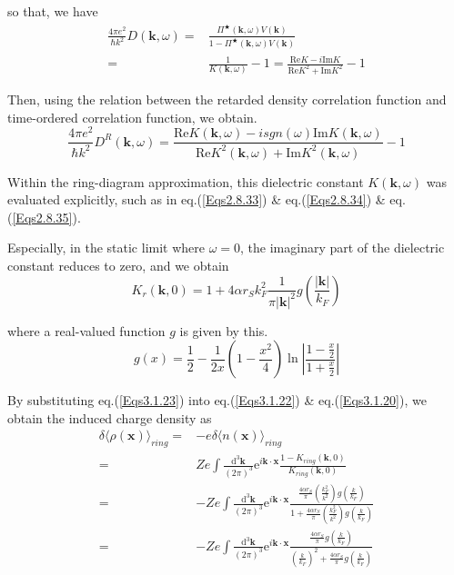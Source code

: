 so that, we have
\begin{equation} \label{Eqs3.1.21} \begin{split}
\frac{4\pi e^2}{\hbar k^2} D(\mathbf{k},\omega) =& \frac{\Pi^\bigstar(\mathbf{k},\omega)V(\mathbf{k})}{1-\Pi^\bigstar(\mathbf{k},\omega)V(\mathbf{k})}\\
=& \frac{1}{K(\mathbf{k},\omega)}-1 = \frac{\text{Re} K -i \text{Im} K}{ \text{Re} K^2 + \text{Im} K^2} - 1
\end{split}\end{equation}

Then, using the relation between the retarded density correlation function and time-ordered correlation function, we obtain.
\begin{equation} \label{Eqs3.1.22}
\frac{4\pi e^2}{\hbar k^2} D^R(\mathbf{k},\omega) = \frac{\text{Re} K(\mathbf{k},\omega) - i sgn(\omega) \text{Im} K(\mathbf{k},\omega)}{\text{Re} K^2(\mathbf{k},\omega) + \text{Im} K^2(\mathbf{k},\omega)} - 1
\end{equation}

Within the ring-diagram approximation, this dielectric constant $K(\mathbf{k},\omega)$ was evaluated explicitly, such as in eq.(\ref{Eqs2.8.33}) \& eq.(\ref{Eqs2.8.34}) \& eq.(\ref{Eqs2.8.35}).

Especially, in the static limit where $\omega=0$, the imaginary part of the dielectric constant reduces to zero, and we obtain
\begin{equation} \label{Eqs3.1.23}
K_r(\mathbf{k},0) = 1+ 4 \alpha r_S k_F^2 \frac{1}{\pi |\mathbf{k}|^2} g\left( \frac{|\mathbf{k}|}{k_F} \right)
\end{equation}

where a real-valued function $g$ is given by this.
\begin{equation} \label{Eqs3.1.24}
g(x) = \frac{1}{2} - \frac{1}{2x}\left( 1-\frac{x^2}{4} \right) \ln \left| \frac{1-\frac{x}{2}}{1+\frac{x}{2}} \right|
\end{equation}

By substituting eq.(\ref{Eqs3.1.23}) into eq.(\ref{Eqs3.1.22}) \& eq.(\ref{Eqs3.1.20}), we obtain the induced charge density as
\[ \begin{split}
\delta\langle \rho(\mathbf{x}) \rangle_{ring} =& - e \delta\langle n(\mathbf{x}) \rangle_{ring}\\
=& Z e \int \frac{\mathrm{d}^3 \mathbf{k}}{(2\pi)^3} \mathrm{e}^{i \mathbf{k} \cdot \mathbf{x}}\frac{1-K_{ring}(\mathbf{k},0)}{K_{ring}(\mathbf{k},0)}\\
=&-Z e \int \frac{\mathrm{d}^3 \mathbf{k}}{(2\pi)^3} \mathrm{e}^{i \mathbf{k} \cdot \mathbf{x}}\frac{\frac{4\alpha r_S}{\pi}\left( \frac{k_F^2}{k^2} \right)g\left( \frac{k}{k_F} \right)}{1+\frac{4\alpha r_S}{\pi}\left( \frac{k_F^2}{k^2} \right)g\left( \frac{k}{k_F} \right)}\\
=&-Z e \int \frac{\mathrm{d}^3 \mathbf{k}}{(2\pi)^3} \mathrm{e}^{i \mathbf{k} \cdot \mathbf{x}}\frac{\frac{4\alpha r_S}{\pi}g\left( \frac{k}{k_F} \right)}{\left( \frac{k}{k_F} \right)^2+\frac{4\alpha r_S}{\pi}g\left( \frac{k}{k_F} \right)}
\end{split} \]

